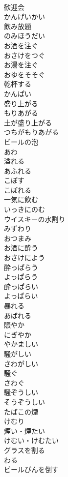 \documentclass[8pt]{extreport}
\begin{document}
\begin{CJK}{UTF8}{min}
\\	歓迎会	
\\	かんげいかい
\\	飲み放題	
\\	のみほうだい
\\	お酒を注ぐ	
\\	おさけをつぐ
\\	お湯を注ぐ	
\\	おゆをそそぐ
\\	乾杯する	
\\	かんぱい
\\	盛り上がる	
\\	もりあがる
\\	土が盛り上がる	
\\	つちがもりあがる
\\	ビールの泡	
\\	あわ
\\	溢れる	
\\	あふれる
\\	こぼす	
\\	こぼれる	
\\	一気に飲む	
\\	いっきにのむ
\\	ウイスキーの水割り	
\\	みずわり
\\	おつまみ	
\\	お酒に酔う	
\\	おさけによう
\\	酔っぱらう	
\\	よっぱらう
\\	酔っぱらい	
\\	よっぱらい
\\	暴れる	
\\	あばれる
\\	賑やか	
\\	にぎやか
\\	やかましい	
\\	騒がしい	
\\	さわがしい
\\	騒ぐ	
\\	さわぐ
\\	騒ぞうしい	
\\	そうぞうしい
\\	たばこの煙	
\\	けむり
\\	煙い・煙たい	
\\	けむい・けむたい
\\	グラスを割る	
\\	わる
\\	ビールびんを倒す	

\end{CJK}
\end{document}
